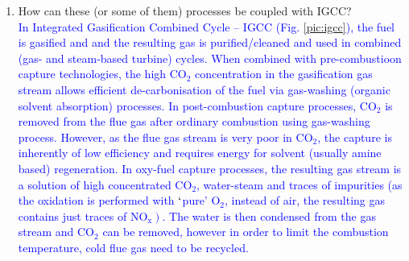 \documentclass[14pt,twoside]{article}
\begin{document}
\begin{enumerate}
\begin{enumerate}
\item How can these (or some of them) processes be coupled with IGCC?\\
  \textcolor{blue}{
In Integrated Gasification Combined Cycle -- IGCC (Fig. \ref{pic:igcc}), the fuel is gasified and and the resulting gas is purified/cleaned and used in combined (gas- and steam-based turbine) cycles. When combined with pre-combustioon capture technologies, the high CO$_{\text{2}}$ concentration in the gasification gas stream allows efficient de-carbonisation of the fuel via gas-washing (organic solvent absorption) processes. In post-combustion capture processes, CO$_{\text{2}}$ is removed from the flue gas after ordinary combustion using gas-washing process. However, as the flue gas stream is very poor in CO$_{\text{2}}$, the capture is inherently of low efficiency and requires energy for solvent (usually amine based) regeneration. In oxy-fuel capture processes, the resulting gas stream is a solution of high concentrated CO$_{\text{2}}$, water-steam and traces of impurities (as the oxidation is performed with $\lq$pure' O$_{\text{2}}$, instead of air, the resulting gas contains just traces of NO$\left._{\text{x}}\right)$. The water is then condensed from the gas stream and CO$_{\text{2}}$ can be removed, however in order to limit the combustion temperature, cold flue gas need to be recycled.}


\end{enumerate}
\end{enumerate}
\end{document}
